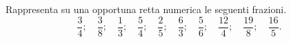 \begin{comment}
\begin{esercizio}
\label{ese:3.137}
Relativamente alla figura~\ref{fig:3.6}, quale proposizione è vera?

\begin{enumeratees}
\item Il segmento~\(AB\) la divide in due parti uguali;
\item il segmento~\(AB\) la divide in due quadrilateri.
\end{enumeratees}
\end{esercizio}

 \begin{esercizio}
 \label{ese:3.138}
La parte in grigio rappresenta~\(1/4\) della figura~\ref{fig:3.7}?
\end{esercizio}

\begin{esercizio}
\label{ese:3.139}
 Costruisci una figura che sia gli~\(11/6\) della figura~\ref{fig:3.8}.
\end{esercizio}

\begin{esercizio}
\label{ese:3.140}
Colora i~\(3/4\) della figura~\ref{fig:3.9}.
\end{esercizio}

\begin{esercizio}
\label{ese:3.141}
Costruire la frazione~\(\frac{N}{D}\) significa dividere l'unità in \ldots 
parti uguali e prendere \ldots parti.
\end{esercizio}

\end{comment} 

\begin{esercizio}
\label{ese:3.142}
Rappresenta su una opportuna retta numerica le seguenti frazioni.
\[\frac{3}{4};\quad\frac{3}{8};\quad\frac{1}{3};\quad\frac{5}{4};\quad
\frac{2}{5};\quad\frac{6}{3};\quad\frac{5}{6};\quad%
\frac{12}{4};\quad\frac{19}{8};\quad\frac{16}{5}.\]
\end{esercizio}

